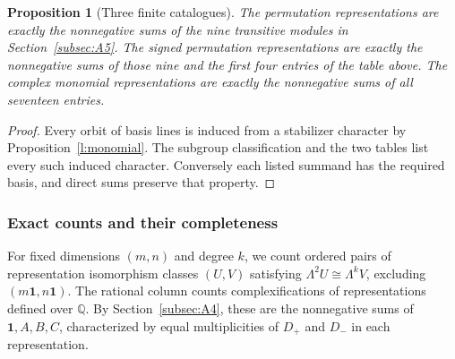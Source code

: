 \documentclass[11pt,a4paper]{article}
\newtheorem{proposition}{Proposition}[section]
\begin{document}
\begin{proposition}[Three finite catalogues]\label{p:catalogue}
The permutation representations are exactly the nonnegative sums of the nine transitive modules in Section~\ref{subsec:A5}. The signed permutation representations are exactly the nonnegative sums of those nine and the first four entries of the table above. The complex monomial representations are exactly the nonnegative sums of all seventeen entries.
\end{proposition}
\begin{proof}
Every orbit of basis lines is induced from a stabilizer character by Proposition~\ref{l:monomial}. The subgroup classification and the two tables list every such induced character. Conversely each listed summand has the required basis, and direct sums preserve that property.
\end{proof}

\subsubsection*{Exact counts and their completeness}
For fixed dimensions $(m,n)$ and degree $k$, we count ordered pairs of representation isomorphism classes $(U,V)$ satisfying $\Lambda^2U\cong\Lambda^kV$, excluding $(m\mathbf1,n\mathbf1)$. The rational column counts complexifications of representations defined over $\mathbb Q$. By Section~\ref{subsec:A4}, these are the nonnegative sums of $\mathbf1,A,B,C$, characterized by equal multiplicities of $D_+$ and $D_-$ in each representation.
\end{document}
